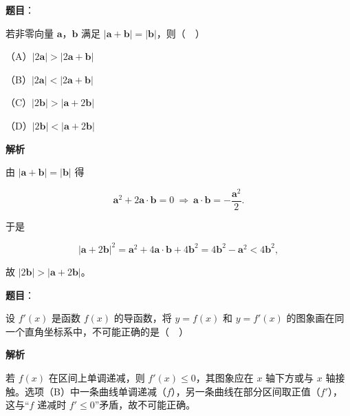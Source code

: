 \begin{answer}

\textbf{题目}：

若非零向量 $\boldsymbol a$，$\boldsymbol b$ 满足 $|\boldsymbol a+\boldsymbol b|=|\boldsymbol b|$，则（　）

（A）$|2\boldsymbol a|>|2\boldsymbol a+\boldsymbol b|$

（B）$|2\boldsymbol a|<|2\boldsymbol a+\boldsymbol b|$

（C）$|2\boldsymbol b|>|\boldsymbol a+2\boldsymbol b|$

（D）$|2\boldsymbol b|<|\boldsymbol a+2\boldsymbol b|$

\textbf{解析}

由 $|\boldsymbol a+\boldsymbol b|=|\boldsymbol b|$ 得

\nopagebreak[4]
\[\boldsymbol a^2+2\boldsymbol a\cdot\boldsymbol b=0\ \Rightarrow\ \boldsymbol a\cdot\boldsymbol b=-\frac{\boldsymbol a^2}{2}.\]

于是

\nopagebreak[4]
\[|\boldsymbol a+2\boldsymbol b|^2=\boldsymbol a^2+4\boldsymbol a\cdot\boldsymbol b+4\boldsymbol b^2=4\boldsymbol b^2-\boldsymbol a^2<4\boldsymbol b^2,\]

故 $|2\boldsymbol b|>|\boldsymbol a+2\boldsymbol b|$。


\end{answer}
\begin{answer}

\textbf{题目}：

设 $f'(x)$ 是函数 $f(x)$ 的导函数，将 $y=f(x)$ 和 $y=f'(x)$ 的图象画在同一个直角坐标系中，不可能正确的是（　）
\nopagebreak[4]
\begin{center}\end{center}
\nopagebreak[4]
\textbf{解析}

若 $f(x)$ 在区间上单调递减，则 $f'(x)\leqslant0$，其图象应在 $x$ 轴下方或与 $x$ 轴接触。选项（B）中一条曲线单调递减（$f$），另一条曲线在部分区间取正值（$f'$），这与“$f$ 递减时 $f'\leqslant0$”矛盾，故不可能正确。


\end{answer}
